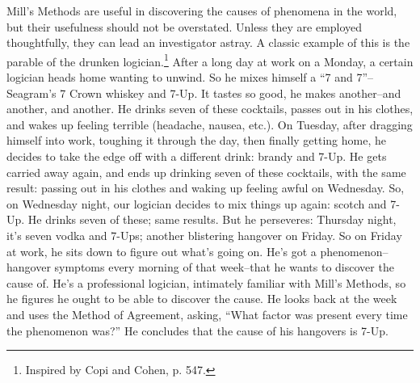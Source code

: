 Mill's Methods are useful in discovering the causes of phenomena in the world, but their usefulness
should not be overstated. Unless they are employed thoughtfully, they can lead an investigator
astray. A classic example of this is the parable of the drunken 
logician.\footnote{Inspired by Copi and Cohen, p. 547.} 
After a long day at work
on a Monday, a certain logician heads home wanting to unwind. So he mixes himself a ``7 and
7''--Seagram's 7 Crown whiskey and 7-Up. It tastes so good, he makes another--and another, and
another. He drinks seven of these cocktails, passes out in his clothes, and wakes up feeling terrible
(headache, nausea, etc.). On Tuesday, after dragging himself into work, toughing it through the
day, then finally getting home, he decides to take the edge off with a different drink: brandy and
7-Up. He gets carried away again, and ends up drinking seven of these cocktails, with the same
result: passing out in his clothes and waking up feeling awful on Wednesday. So, on Wednesday
night, our logician decides to mix things up again: scotch and 7-Up. He drinks seven of these; same
results. But he perseveres: Thursday night, it's seven vodka and 7-Ups; another blistering hangover
on Friday. So on Friday at work, he sits down to figure out what's going on. He's got a
phenomenon--hangover symptoms every morning of that week--that he wants to discover the
cause of. He's a professional logician, intimately familiar with Mill's Methods, so he figures he
ought to be able to discover the cause. He looks back at the week and uses the Method of
Agreement, asking, ``What factor was present every time the phenomenon was?'' He concludes
that the cause of his hangovers is 7-Up.

